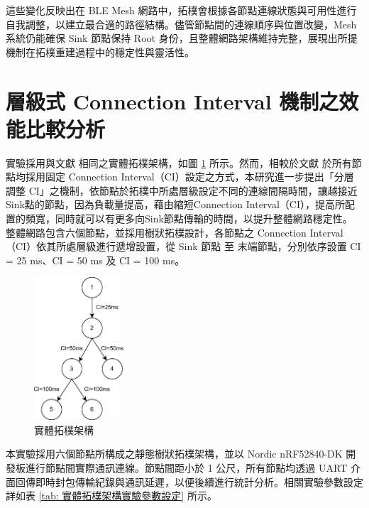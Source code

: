 \begin{ZhChapter}
這些變化反映出在 BLE Mesh 網路中，拓樸會根據各節點連線狀態與可用性進行自我調整，以建立最合適的路徑結構。儘管節點間的連線順序與位置改變，Mesh 系統仍能確保 Sink 節點保持 Root 身份，且整體網路架構維持完整，展現出所提機制在拓樸重建過程中的穩定性與靈活性。

\section{層級式 Connection Interval 機制之效能比較分析}
實驗採用與文獻 \cite{112TIT00392032} 相同之實體拓樸架構，如圖 \ref{fig: 實體拓樸架構} 所示。然而，相較於文獻 \cite{112TIT00392032} 於所有節點均採用固定 Connection Interval（CI）設定之方式，本研究進一步提出「分層調整 CI」之機制，依節點於拓樸中所處層級設定不同的連線間隔時間，讓越接近Sink點的節點，因為負載量提高，藉由縮短Connection Interval（CI），提高所配置的頻寬，同時就可以有更多向Sink節點傳輸的時間，以提升整體網路穩定性。
整體網路包含六個節點，並採用樹狀拓樸設計，各節點之 Connection Interval（CI）依其所處層級進行遞增設置，從 Sink 節點 至 末端節點，分別依序設置 CI = 25 ms、CI = 50 ms 及 CI = 100 ms。

\begin{figure}[H]
    \centering
    \includegraphics[width = 0.3\textwidth]{image/BLE Mesh封包傳輸機制設計節點架構圖.png}
    \caption{實體拓樸架構}
    \label{fig: 實體拓樸架構}
\end{figure}

本實驗採用六個節點所構成之靜態樹狀拓樸架構，並以 Nordic nRF52840-DK 開發板進行節點間實際通訊連線。節點間距小於 1 公尺，所有節點均透過 UART 介面回傳即時封包傳輸紀錄與通訊延遲，以便後續進行統計分析。相關實驗參數設定詳如表 \ref{tab: 實體拓樸架構實驗參數設定} 所示。


\end{ZhChapter}
